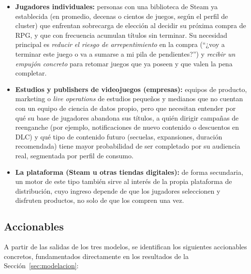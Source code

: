 \documentclass[11pt,letterpaper]{article}
\begin{document}
\begin{itemize}
  \item \textbf{Jugadores individuales:} personas con una biblioteca de Steam ya establecida (en promedio, decenas o cientos de juegos, según el perfil de cluster) que enfrentan sobrecarga de elección al decidir su próxima compra de RPG, y que con frecuencia acumulan títulos sin terminar. Su necesidad principal es \emph{reducir el riesgo de arrepentimiento} en la compra (``¿voy a terminar este juego o va a sumarse a mi pila de pendientes?'') y \emph{recibir un empujón concreto} para retomar juegos que ya poseen y que valen la pena completar.
  \item \textbf{Estudios y publishers de videojuegos (empresas):} equipos de producto, marketing o \textit{live operations} de estudios pequeños y medianos que no cuentan con un equipo de ciencia de datos propio, pero que necesitan entender por qué su base de jugadores abandona sus títulos, a quién dirigir campañas de reenganche (por ejemplo, notificaciones de nuevo contenido o descuentos en DLC) y qué tipo de contenido futuro (secuelas, expansiones, duración recomendada) tiene mayor probabilidad de ser completado por su audiencia real, segmentada por perfil de consumo.
  \item \textbf{La plataforma (Steam u otras tiendas digitales):} de forma secundaria, un motor de este tipo también sirve al interés de la propia plataforma de distribución, cuyo ingreso depende de que los jugadores seleccionen y disfruten productos, no solo de que los compren una vez.
\end{itemize}

\subsection{Accionables}

A partir de las salidas de los tres modelos, se identifican los siguientes accionables concretos, fundamentados directamente en los resultados de la Sección~\ref{sec:modelacion}:
\end{document}
